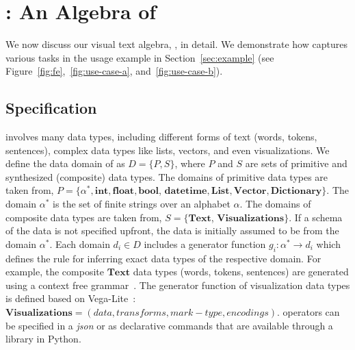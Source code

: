 

\section{\vta: An Algebra of \vita}\label{sec:vta}
We now discuss our visual text algebra, \vta, in detail.
We demonstrate how \vta captures various tasks in the usage example in Section~\ref{sec:example}
(see Figure~\ref{fig:fe},~\ref{fig:use-case-a}, and~\ref{fig:use-case-b}). 



\subsection{\vta Specification}\label{sec:data_domain}
\vita involves many data types, including different forms of text (\eg words, tokens, sentences), complex data types like lists, vectors, and even visualizations. We define the data domain of \vita as $D = \{P, S\}$, where $P$ and $S$ are sets of primitive and synthesized (\ie composite) data types. The domains of primitive data types are taken from, $P = \{\alpha^*, \mathbf{int}, \mathbf{float}, \mathbf{bool}$,
$\mathbf{datetime},\mathbf{List}, \mathbf{Vector}, \mathbf{Dictionary}\}$. The domain $\alpha^*$ is the set of finite strings
over an alphabet $\alpha$. The domains of composite data types are taken from, $S = \{\mathbf{Text}$, $\mathbf{Visualizations}\}$. If a  schema of the data is not specified upfront, the data is initially assumed to be from the domain $\alpha^*$. Each domain $d_i \in D$ includes a generator function $g_i: \alpha^* \rightarrow d_i$ which defines the rule for inferring exact data types of the respective domain. For example, the composite $\mathbf{Text}$ data types (\eg words, tokens, sentences) are generated using a context free grammar~\cite{charniak1997statistical}. The generator function of visualization data types is defined based on Vega-Lite~\cite{satyanarayan2016vega}: $\mathbf{Visualizations} = (data, transforms, mark-type, encodings)$. \vta operators can be specified in a \emph{json} or as declarative commands that are available through a \vta library in Python.


